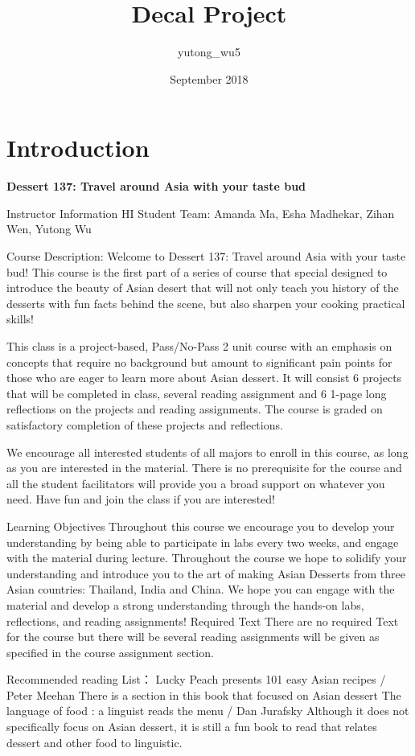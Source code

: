 \documentclass{article}
\title{Decal Project}
\author{yutong_wu5 }
\date{September 2018}
\begin{document}
\maketitle

\section{Introduction}

\textbf{Dessert 137: Travel around Asia with your taste bud}
\hfill

Instructor Information HI
Student Team: Amanda Ma, Esha Madhekar, Zihan Wen, Yutong Wu

Course Description:
Welcome to Dessert 137: Travel around Asia with your taste bud! This course is the first part of a series of course that special designed to introduce the beauty of Asian desert that will not only teach you history of the desserts with fun facts behind the scene, but also sharpen your cooking practical skills!

This class is a project-based, Pass/No-Pass 2 unit course with an emphasis on concepts that require no background but amount to significant pain points for those who are eager to learn more about Asian dessert. It will consist 6 projects that will be completed in class, several reading assignment and 6 1-page long reflections on the projects and reading assignments. The course is graded on satisfactory completion of these projects and reflections.

We encourage all interested students of all majors to enroll in this course, as long as you are interested in the material. There is no prerequisite for the course and all the student facilitators will provide you a broad support on whatever you need. Have fun and join the class if you are interested!

Learning Objectives
Throughout this course we encourage you to develop your understanding by being able to participate in labs every two weeks, and engage with the material during lecture. Throughout the course we hope to solidify your understanding and introduce you to the art of making Asian Desserts from three Asian countries: Thailand, India and China. We hope you can engage with the material and develop a strong understanding through the hands-on labs, reflections, and reading assignments!
Required Text
There are no required Text for the course but there will be several reading assignments will be given as specified in the course assignment section. 

Recommended reading List：
Lucky Peach presents 101 easy Asian recipes / Peter Meehan 
There is a section in this book that focused on Asian dessert
The language of food : a linguist reads the menu / Dan Jurafsky
Although it does not specifically focus on Asian dessert, it is still a fun book to read that relates dessert and other food to linguistic.
\end{document}
